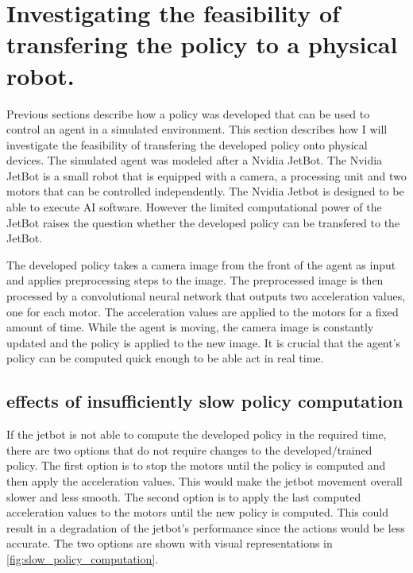 
\section{Investigating the feasibility of transfering the policy to a physical robot.}

Previous sections describe how a policy was developed that can be used to control an agent in a simulated environment. This section describes how I will investigate the feasibility of transfering the developed policy onto physical devices. The simulated agent was modeled after a Nvidia JetBot. The Nvidia JetBot is a small robot that is equipped with a camera, a processing unit and two motors that can be controlled independently. 
The Nvidia Jetbot is designed to be able to execute AI software. However the limited computational power of the JetBot raises the question whether the developed policy can be transfered to the JetBot. 

The developed policy takes a camera image from the front of the agent as input and applies preprocessing steps to the image. The preprocessed image is then processed by a convolutional neural network that outputs two acceleration values, one for each motor. The acceleration values are applied to the motors for a fixed amount of time. While the agent is moving, the camera image is constantly updated and the policy is applied to the new image. It is crucial that the agent's policy can be computed quick enough to be able act in real time. 

\subsection{effects of insufficiently slow policy computation}
If the jetbot is not able to compute the developed policy in the required time, there are two options that do not require changes to the developed/trained policy. The first option is to stop the motors until the policy is computed and then apply the acceleration values. This would make the jetbot movement overall slower and less smooth.
The second option is to apply the last computed acceleration values to the motors until the new policy is computed. This could result in a degradation of the jetbot's performance since the actions would be less accurate.
The two options are shown with visual representations in \ref{fig:slow_policy_computation}.


